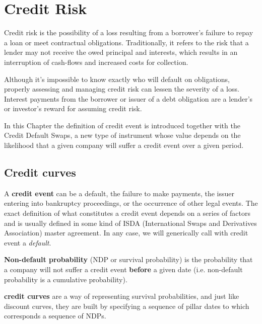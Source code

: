 \chapter{Credit Risk}\label{credit_default_swaps}

Credit risk is the possibility of a loss resulting from a borrower's failure to repay a loan or meet contractual obligations. Traditionally, it refers to the risk that a lender may not receive the owed principal and interests, which results in an interruption of cash-flows and increased costs for collection. 

Although it's impossible to know exactly who will default on obligations, properly assessing and managing credit risk can lessen the severity of a loss. Interest payments from the borrower or issuer of a debt obligation are a lender's or investor's reward for assuming credit risk.

In this Chapter the definition of credit event is introduced together with the Credit Default Swaps, a new type of instrument whose value depends on the likelihood that a given company will suffer a credit event over a given period.

\section{Credit curves}
\label{credit-curves}

A \textbf{credit event} can be a default, the failure to make payments, the issuer entering into bankruptcy proceedings, or the occurrence of other legal events. The exact definition of what constitutes a credit event depends on a series of factors and is usually defined in some kind of ISDA (International Swaps and Derivatives Association) master agreement. In any case, we will generically call with credit event a \emph{default}.

\textbf{Non-default probability} (NDP or survival probability) is the probability that a company will not suffer a credit event \textbf{before} a given date (i.e. non-default probability is a cumulative probability).

\textbf{credit curves} are a way of representing survival probabilities, and just like discount curves, they are built by specifying a sequence of pillar dates to which corresponds a sequence of NDPs. 


